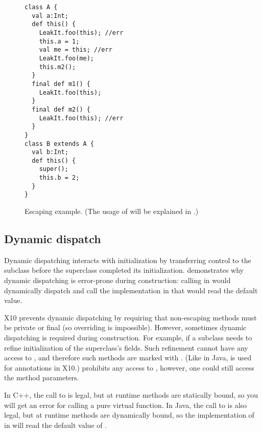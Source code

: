 \begin{figure}
\begin{lstlisting}
class A {
  val a:Int;
  def this() {
    LeakIt.foo(this); //err
    this.a = 1;
    val me = this; //err
    LeakIt.foo(me);
    this.m2();
  }
  final def m1() {
    LeakIt.foo(this);
  }
  final def m2() {
    LeakIt.foo(this); //err
  }
}
class B extends A {
  val b:Int;
  def this() {
    super();
    this.b = 2;
  }
}
\end{lstlisting}
\caption{Escaping \this example.
    (The usage of  will be explained in .)}
\label{Figure:Escaping-this}
\end{figure}



\subsection{Dynamic dispatch}
Dynamic dispatching interacts with initialization by transferring control to the subclass
    before the superclass completed its initialization.
 demonstrates why dynamic dispatching is error-prone during construction:
    calling  in  would dynamically dispatch and
    call the implementation in 
    that would read the default value.

X10 prevents dynamic dispatching by requiring that non-escaping methods
    must be private or final
    (so overriding is impossible).
However, sometimes dynamic dispatching is required during construction.
For example, if a subclass needs to refine initialization
    of the superclass's fields.
Such refinement cannot have any access to \this, and therefore
    such methods are marked with .
(Like in Java,  is used for annotations in X10.)
 prohibits any access to \this,
    however, one could still access the method parameters.


In C++, the call to  is legal,
    but at runtime
    methods are statically bound,
    so you will get an error for calling a pure virtual function.
In Java, the call to  is also legal,
    but at runtime
    methods are dynamically bound,
    so the implementation of  in 
    will read the default value of .

